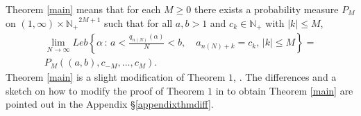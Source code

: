 \documentclass{conm-p-l}
\numberwithin{equation}{section}
\begin{document}
Theorem \ref{main} means that for each $M\geq0$ there
exists a probability measure $P_M$ on $(1,\infty) \times {\mathbb{N}_+}^{2M+1}$
such that for all $a, b >1$ and $c_k\in \mathbb{N}_+$ with $| k|\leq  M$, 
\begin{equation} \label{limitingdenom}
\begin{split}
\lim_{N\rightarrow \infty}  Leb  \left\{ \alpha  {\, : \, } a < \frac{q_{n(N)}(\alpha)}{N} <
b,  \quad a_{n(N)+ k} = c_k, \, | k|\leq  M \right\} =
\\
P_M \left(
(a,b), c_{-M}, \dots, c_{M} \right).
\end{split}
\end{equation}
Theorem \ref{main} is a slight modification of Theorem $1$, \cite{SU:ren}. The
differences and a sketch on how to modify the proof of Theorem $1$ in
\cite{SU:ren} to obtain Theorem \ref{main} are pointed out in the Appendix \S\ref{appendixthmdiff}.
\end{document}
